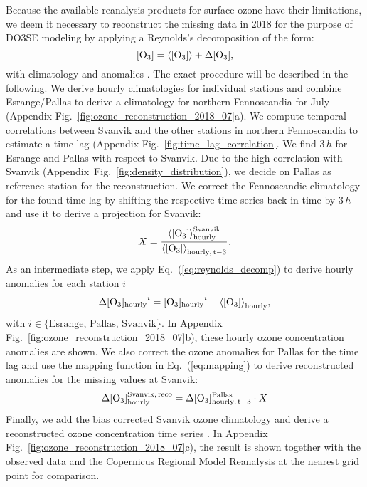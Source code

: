 \documentclass[bg, manuscript]{copernicus}
\begin{document}
Because the available reanalysis products for surface ozone have their limitations, we deem it necessary to reconstruct the missing data in 2018 for the purpose of DO3SE modeling by applying a Reynolds's decomposition of the form:
\begin{equation}
  \chem{[O_3]} = \chem{\left<[O_3]\right>} + \chem{\Delta[O_3]},
  \label{eq:reynolds_decomp}
\end{equation}
with climatology \chem{\left<[O_3]\right>} and anomalies \chem{\Delta[O_3]}.
The exact procedure will be described in the following.
We derive hourly climatologies for individual stations and combine Esrange/Pallas to derive a climatology for northern Fennoscandia for July (Appendix Fig.~\ref{fig:ozone_reconstruction_2018_07}a). We compute temporal correlations between Svanvik and the other stations in northern Fennoscandia to estimate a time lag (Appendix Fig.~\ref{fig:time_lag_correlation}. We find $3\,\unit{h}$ for Esrange and Pallas with respect to Svanvik. Due to the high correlation with Svanvik (Appendix~Fig.~\ref{fig:density_distribution}), we decide on Pallas as reference station for the reconstruction. We correct the Fennoscandic climatology for the found time lag  by shifting the respective time series back in time by $3\,\unit{h}$ and use it to derive a projection for Svanvik:
\begin{equation}
  X = \frac{\chem{\left<[O_3]\right>_{hourly}^{Svanvik}}}{\chem{\left<[O_3]\right>_{hourly,\,t-3}}}.
  \label{eq:mapping}
\end{equation}
As an intermediate step, we apply Eq.~(\ref{eq:reynolds_decomp}) to derive hourly anomalies for each station $i$
\begin{equation}
  \chem{\Delta[O_3]_{hourly}}^i = \chem{[O_3]_{hourly}}^i-\chem{\left<[O_3]\right>_{hourly}},
\end{equation}
with $i \in \{\text{Esrange, Pallas, Svanvik\}}$.
In Appendix Fig.~\ref{fig:ozone_reconstruction_2018_07}b), these hourly ozone concentration anomalies are shown. We also correct the ozone anomalies for Pallas for the time lag  and use the mapping function in Eq.~(\ref{eq:mapping}) to derive reconstructed anomalies for the missing values at Svanvik:
\begin{equation}
    \chem{\Delta [O_3]_{hourly}^{Svanvik,\,reco}} = \chem{\Delta[O_3]_{hourly,\,t-3}^{Pallas}} \cdot X
\end{equation}
Finally, we add the bias corrected Svanvik ozone climatology and derive a reconstructed ozone concentration time series . In Appendix Fig.~\ref{fig:ozone_reconstruction_2018_07}c), the result is shown together with the observed data and the Copernicus Regional Model Reanalysis at the nearest grid point for comparison.
\end{document}

